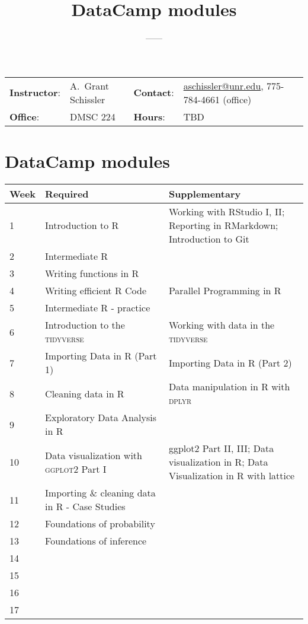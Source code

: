 \documentclass[11pt,onecolumn]{article}
\title{\textbf{\coursename\\DataCamp modules}}
\author{{\semester}---{\roomnumb}---{\classtimes}}
\date{}
\makeatletter
\newcommand{\myname}{A.~Grant Schissler}
\newcommand{\myemail}{aschissler@unr.edu}
\newcommand{\office}{DMSC 224}
\newcommand{\officehours}{TBD}
\makeatother
\begin{document}
\maketitle

\vspace{-0.25in}
\noindent\makebox[\linewidth]{\rule{\textwidth}{1pt}}

\begin{center}
\begin{tabular}{llll}
\textbf{Instructor}:&\myname & \textbf{Contact}:&\href{mailto:\myemail}{\myemail}, 775-784-4661 (office)\\
\textbf{Office}:&\office & \textbf{Hours}:&\officehours\\
\end{tabular}
\end{center}

\noindent\makebox[\linewidth]{\rule{\textwidth}{1pt}}

\section*{DataCamp modules}
\begin{center}
  \begin{tabular}{|p{0.05\linewidth}|p{0.45\linewidth}|p{0.5\linewidth}|}
    \hline
    Week & Required & Supplementary \\
    \hline
    \hline
    1 & Introduction to R & Working with RStudio I, II; Reporting in RMarkdown; Introduction to Git \\
    \hline
    2 & Intermediate R & \\
    \hline
    3 & Writing functions in R & \\
    \hline
    4 & Writing efficient R Code & Parallel Programming in R \\ 
    \hline
    5 & Intermediate R - practice & \\
    \hline
    \hline
    6 & Introduction to the \textsc{tidyverse} & Working with data in the \textsc{tidyverse} \\
    \hline
    7 & Importing Data in R (Part 1) & Importing Data in R (Part 2) \\ 
    \hline
    8 & Cleaning data in R & Data manipulation in R with \textsc{dplyr} \\
    \hline
    9 & Exploratory Data Analysis in R &  \\
    \hline
    10 & Data visualization with \textsc{ggplot2} Part I & ggplot2 Part II, III; Data visualization in R; Data Visualization in R with lattice \\
    \hline
    11 & Importing \& cleaning data in R - Case Studies &  \\
    \hline
    \hline
    12 & Foundations of probability &  \\
    \hline
    13 & Foundations of inference &  \\
    \hline
    \hline
    14 & & \\
    \hline
    15 & & \\
    \hline
    16 & & \\
    \hline
    17 & & \\
    \hline
\end{tabular}
\end{center}
\end{document}
